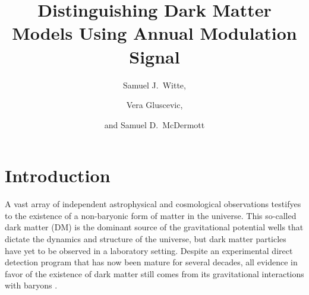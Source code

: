 \documentclass[11pt]{article}
\begin{document}
\title{Distinguishing Dark Matter Models Using Annual Modulation Signal}
\author[a,b]{Samuel J.~Witte,}
\author[c]{Vera Gluscevic,}
\author[d]{and Samuel D.~McDermott}






\abstract{


}

\maketitle

\section{Introduction} \setcounter{page}{2}

A vast array of independent astrophysical and cosmological observations testifyes to the existence of a non-baryonic form of matter in the universe. This so-called dark matter (DM) is the dominant source of the gravitational potential wells that dictate the dynamics and structure of the universe, but dark matter particles have yet to be observed in a laboratory setting. Despite an experimental direct detection program that has now been mature for several decades, all evidence in favor of the existence of dark matter still comes from its gravitational interactions with baryons \cite{Bauer:2013ihz}.
\end{document}
